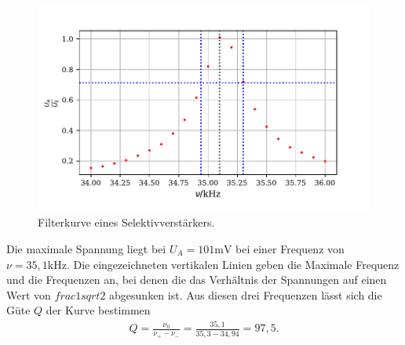 \begin{figure}[H]
  \centering
  \includegraphics{plot1.pdf}
  \caption{Filterkurve eines Selektivverstärkers. }
  \label{fig:plot}
\end{figure}

Die maximale Spannung liegt bei $U_A = 101\si{\milli\volt}$ bei einer Frequenz von $\nu = 35,1\si{\kilo\hertz}$.
Die eingezeichneten vertikalen Linien geben die Maximale Frequenz und die Frequenzen an, bei denen die das Verhältnis der Spannungen auf einen Wert von $frac{1}{sqrt{2}}$ abgesunken ist.
Aus diesen drei Frequenzen lässt sich die Güte $Q$ der Kurve bestimmen
\begin{align*}
Q = \frac{\nu_0}{\nu_+ - \nu_-} = \frac{35,1}{35,3 - 34,94} = 97,5.
\end{align*}



